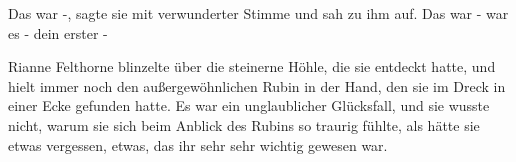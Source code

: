 \glqq{}Das war -\grqq{}, sagte sie mit verwunderter Stimme und sah zu ihm auf.
\glqq{}Das war - war es - dein erster -\grqq{}

Rianne Felthorne blinzelte über die steinerne Höhle, die sie entdeckt hatte, und
hielt immer noch den außergewöhnlichen Rubin in der Hand, den sie im Dreck in
einer Ecke gefunden hatte. Es war ein unglaublicher Glücksfall, und sie wusste
nicht, warum sie sich beim Anblick des Rubins so traurig fühlte, als hätte sie
etwas vergessen, etwas, das ihr sehr sehr wichtig gewesen war.

